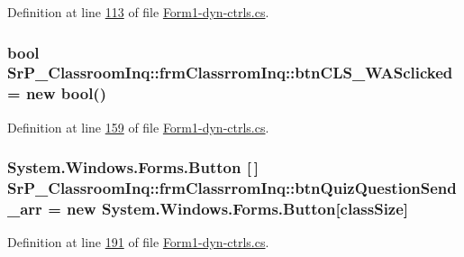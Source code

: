 \-Definition at line \hyperlink{_form1-dyn-ctrls_8cs_source_l00113}{113} of file \hyperlink{_form1-dyn-ctrls_8cs_source}{\-Form1-\/dyn-\/ctrls.\-cs}.

\hypertarget{class_sr_p___classroom_inq_1_1frm_classrrom_inq_aed9d1ad7c4e2b196997c1820ac2cdb4d}{
\subsubsection[{btn\-C\-L\-S\-\_\-\-W\-A\-Sclicked}]{\setlength{\rightskip}{0pt plus 5cm}bool {\bf \-Sr\-P\-\_\-\-Classroom\-Inq\-::frm\-Classrrom\-Inq\-::btn\-C\-L\-S\-\_\-\-W\-A\-Sclicked} = new bool()}}
\label{class_sr_p___classroom_inq_1_1frm_classrrom_inq_aed9d1ad7c4e2b196997c1820ac2cdb4d}


\-Definition at line \hyperlink{_form1-dyn-ctrls_8cs_source_l00159}{159} of file \hyperlink{_form1-dyn-ctrls_8cs_source}{\-Form1-\/dyn-\/ctrls.\-cs}.

\hypertarget{class_sr_p___classroom_inq_1_1frm_classrrom_inq_a007012d0330b5c8ad6b29271ddefe7f9}{
\subsubsection[{btn\-Quiz\-Question\-Send\-\_\-arr}]{\setlength{\rightskip}{0pt plus 5cm}\-System.\-Windows.\-Forms.\-Button \mbox{[}$\,$\mbox{]} {\bf \-Sr\-P\-\_\-\-Classroom\-Inq\-::frm\-Classrrom\-Inq\-::btn\-Quiz\-Question\-Send\-\_\-arr} = new \-System.\-Windows.\-Forms.\-Button\mbox{[}{\bf class\-Size}\mbox{]}}}
\label{class_sr_p___classroom_inq_1_1frm_classrrom_inq_a007012d0330b5c8ad6b29271ddefe7f9}


\-Definition at line \hyperlink{_form1-dyn-ctrls_8cs_source_l00191}{191} of file \hyperlink{_form1-dyn-ctrls_8cs_source}{\-Form1-\/dyn-\/ctrls.\-cs}.

